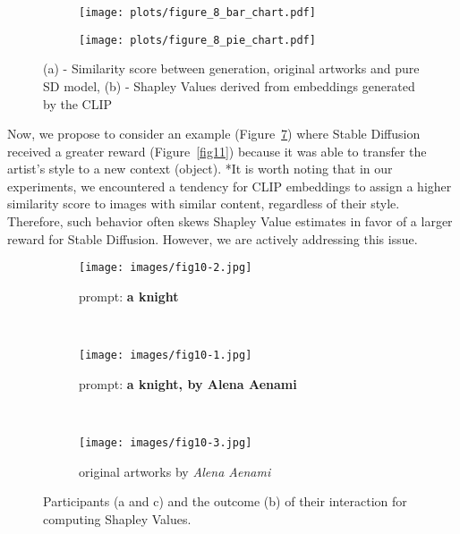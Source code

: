 \documentclass[12pt, letterpaper]{article}
\begin{document}
\begin{figure}[h]
  \centering
  \begin{subfigure}[b]{0.6\textwidth}
    \texttt{[image: plots/figure\_8\_bar\_chart.pdf]}
    \caption{}
        \label{fig8:image1}
  \end{subfigure}%
  \begin{subfigure}[b]{0.4\textwidth}
    \texttt{[image: plots/figure\_8\_pie\_chart.pdf]}
    \caption{}
        \label{fig8:image2}
  \end{subfigure}
 \captionsetup{justification=centering}
  \caption{(a) - Similarity score between generation, original artworks and pure SD model, (b) - Shapley Values derived from embeddings generated by the CLIP}
  \label{fig8}
\end{figure}

Now, we propose to consider an example (Figure~\ref{fig10:stacked_images}) where Stable Diffusion received a greater reward (Figure~\ref{fig11}) because it was able to transfer the artist's style to a new context (object).
*It is worth noting that in our experiments, we encountered a tendency for CLIP embeddings to assign a higher similarity score to images with similar content, regardless of their style. Therefore, such behavior often skews Shapley Value estimates in favor of a larger reward for Stable Diffusion. However, we are actively addressing this issue.

\begin{figure}[h]
    \centering
    
    \begin{subfigure}{\textwidth}
        \centering
        \texttt{[image: images/fig10-2.jpg]}
        \caption{prompt: \textbf{a knight}}
        \label{fig10:sub1}
    \end{subfigure}
    \\
    
    \begin{subfigure}{\textwidth}
        \centering
        \texttt{[image: images/fig10-1.jpg]}
        \caption{prompt: \textbf{a knight,  by Alena Aenami}}
        \label{fig10:sub2}
    \end{subfigure}
    \\
   
    \begin{subfigure}{\textwidth}
        \centering
        \texttt{[image: images/fig10-3.jpg]}
        \caption{original artworks by \textit{Alena Aenami}}
        \label{fig10:sub3}
    \end{subfigure}    

    \caption{Participants (a and c) and the outcome (b) of their interaction for computing Shapley Values.}
    \label{fig10:stacked_images}
\end{figure}
\end{document}
